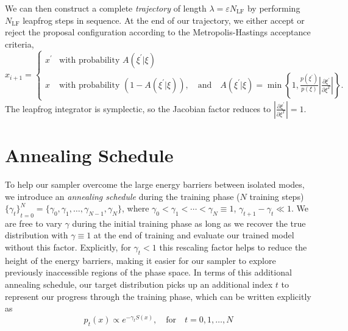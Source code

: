 \documentclass{article} %
\begin{document}
%
We can then construct a complete \emph{trajectory} of length \(\lambda = \varepsilon N_{\mathrm{LF}}\) by
performing \(N_{\mathrm{LF}}\) leapfrog steps in sequence.
%
At the end of our trajectory, we either accept or reject the proposal configuration according to the Metropolis-Hastings
acceptance criteria,
%
\begin{equation}
   x_{i+1} =
   \begin{cases}%
      x^{\prime} &\mbox{with probability } A(\xi^{\prime}|\xi) \\
      x &\mbox{with probability } (1 - A(\xi^{\prime}|\xi)), \quad\text{and}\quad%
         A(\xi^{\prime}|\xi) = \min\left\{%
            1, \frac{p(\xi^{\prime})}{p(\xi)}\left|\frac{\partial{\xi^{\prime}}}{\partial\xi^{T}}\right|%
         \right\}.
   \end{cases}
   \label{eq:mhcriteria}
\end{equation}
%
The leapfrog integrator is symplectic, so the Jacobian factor reduces to
\(\left|\frac{\partial\xi^{\prime}}{\partial\xi^{T}}\right| = 1\). 
%
\section{\label{sec:annealing}Annealing Schedule}
%
To help our sampler overcome the large energy barriers between isolated modes, we introduce an \emph{annealing schedule}
during the training phase (\(N\) training steps) \({\{\gamma_{t}\}}_{t=0}^{N} = \{\gamma_{0}, \gamma_{1}, \ldots,
\gamma_{N-1}, \gamma_{N}\}\), where \(\gamma_{0} < \gamma_{1} < \cdots < \gamma_{N} \equiv 1\), \(\gamma_{t+1} -
\gamma_{t} \ll 1\).
%
We are free to vary \(\gamma\) during the initial training phase as long as we recover the true distribution
with \(\gamma \equiv 1\) at the end of training and evaluate our trained model without this factor.
%
Explicitly, for \(\gamma_{t} < 1\) this rescaling factor helps to reduce the height of the energy barriers, making it
easier for our sampler to explore previously inaccessible regions of the phase space.
%
In terms of this additional annealing schedule, our target distribution picks up an additional index \(t\) to represent
our progress through the training phase, which can be written explicitly as 
%
\begin{equation}
   p_{t}(x)\propto e^{-\gamma_{t} S(x)},\quad\text{for}\quad t=0, 1, \ldots, N
   \label{eq:targetannealing}
\end{equation}
%
\end{document}
